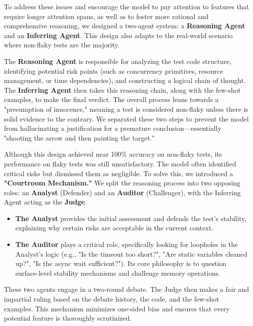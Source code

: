 \documentclass{article}
\begin{document}
To address these issues and encourage the model to pay attention to features that require longer attention spans, as well as to foster more rational and comprehensive reasoning, we designed a two-agent system: a \textbf{Reasoning Agent} and an \textbf{Inferring Agent}. This design also adapts to the real-world scenario where non-flaky tests are the majority.

The \textbf{Reasoning Agent} is responsible for analyzing the test code structure, identifying potential risk points (such as concurrency primitives, resource management, or time dependencies), and constructing a logical chain of thought. The \textbf{Inferring Agent} then takes this reasoning chain, along with the few-shot examples, to make the final verdict. The overall process leans towards a "presumption of innocence," meaning a test is considered non-flaky unless there is solid evidence to the contrary. We separated these two steps to prevent the model from hallucinating a justification for a premature conclusion—essentially "shooting the arrow and then painting the target."

Although this design achieved near 100\% accuracy on non-flaky tests, its performance on flaky tests was still unsatisfactory. The model often identified critical risks but dismissed them as negligible. To solve this, we introduced a \textbf{"Courtroom Mechanism."} We split the reasoning process into two opposing roles: an \textbf{Analyst} (Defender) and an \textbf{Auditor} (Challenger), with the Inferring Agent acting as the \textbf{Judge}.

\begin{itemize}
    \item \textbf{The Analyst} provides the initial assessment and defends the test's stability, explaining why certain risks are acceptable in the current context.
    \item \textbf{The Auditor} plays a critical role, specifically looking for loopholes in the Analyst's logic (e.g., "Is the timeout too short?", "Are static variables cleaned up?", "Is the async wait sufficient?"). Its core philosophy is to question surface-level stability mechanisms and challenge memory operations.
\end{itemize}

These two agents engage in a two-round debate. The Judge then makes a fair and impartial ruling based on the debate history, the code, and the few-shot examples. This mechanism minimizes one-sided bias and ensures that every potential feature is thoroughly scrutinized.
\end{document}

